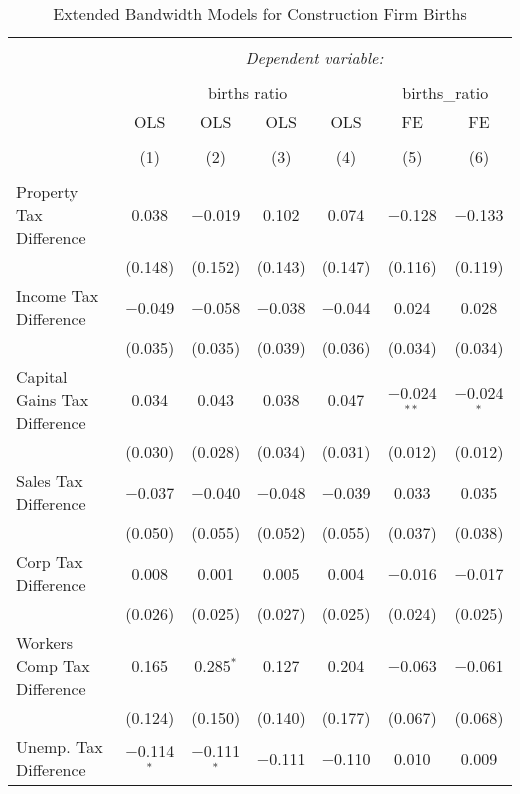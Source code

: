 
\begin{table}[!htbp] \centering 
  \caption{Extended Bandwidth Models for  Construction Firm Births} 
  \label{23eb} 
\begin{tabular}{@{\extracolsep{5pt}}lcccccc} 
\\[-1.8ex]\hline 
\hline \\[-1.8ex] 
 & \multicolumn{6}{c}{\textit{Dependent variable:}} \\ 
\cline{2-7} 
\\[-1.8ex] & \multicolumn{4}{c}{births ratio} & \multicolumn{2}{c}{births\_ratio} \\ 
 & OLS & OLS & OLS & OLS & FE & FE \\ 
\\[-1.8ex] & (1) & (2) & (3) & (4) & (5) & (6)\\ 
\hline \\[-1.8ex] 
 Property Tax Difference & 0.038 & $-$0.019 & 0.102 & 0.074 & $-$0.128 & $-$0.133 \\ 
  & (0.148) & (0.152) & (0.143) & (0.147) & (0.116) & (0.119) \\ 
  Income Tax Difference & $-$0.049 & $-$0.058 & $-$0.038 & $-$0.044 & 0.024 & 0.028 \\ 
  & (0.035) & (0.035) & (0.039) & (0.036) & (0.034) & (0.034) \\ 
  Capital Gains Tax Difference & 0.034 & 0.043 & 0.038 & 0.047 & $-$0.024$^{**}$ & $-$0.024$^{*}$ \\ 
  & (0.030) & (0.028) & (0.034) & (0.031) & (0.012) & (0.012) \\ 
  Sales Tax Difference & $-$0.037 & $-$0.040 & $-$0.048 & $-$0.039 & 0.033 & 0.035 \\ 
  & (0.050) & (0.055) & (0.052) & (0.055) & (0.037) & (0.038) \\ 
  Corp Tax Difference & 0.008 & 0.001 & 0.005 & 0.004 & $-$0.016 & $-$0.017 \\ 
  & (0.026) & (0.025) & (0.027) & (0.025) & (0.024) & (0.025) \\ 
  Workers Comp Tax Difference & 0.165 & 0.285$^{*}$ & 0.127 & 0.204 & $-$0.063 & $-$0.061 \\ 
  & (0.124) & (0.150) & (0.140) & (0.177) & (0.067) & (0.068) \\ 
  Unemp. Tax Difference & $-$0.114$^{*}$ & $-$0.111$^{*}$ & $-$0.111 & $-$0.110 & 0.010 & 0.009 \\ 

\end{tabular}
\end{table}

